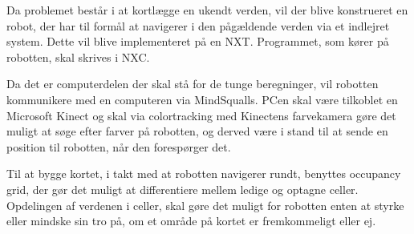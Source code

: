 Da problemet består i at kortlægge en ukendt verden, vil der blive konstrueret en robot, der har til formål at navigerer i den pågældende verden via et indlejret system.
Dette vil blive implementeret på en NXT.
Programmet, som kører på robotten, skal skrives i NXC.

Da det er computerdelen der skal stå for de tunge beregninger, vil robotten kommunikere med en computeren via MindSqualls.
PCen skal være tilkoblet en Microsoft Kinect og skal via colortracking med Kinectens farvekamera gøre det muligt at søge efter farver på robotten, og derved være i stand til at sende en position til robotten, når den forespørger det.

Til at bygge kortet, i takt med at robotten navigerer rundt, benyttes occupancy grid, der gør det muligt at differentiere mellem ledige og optagne celler.
Opdelingen af verdenen i celler, skal gøre det muligt for robotten enten at styrke eller mindske sin tro på, om et område på kortet er fremkommeligt eller ej.